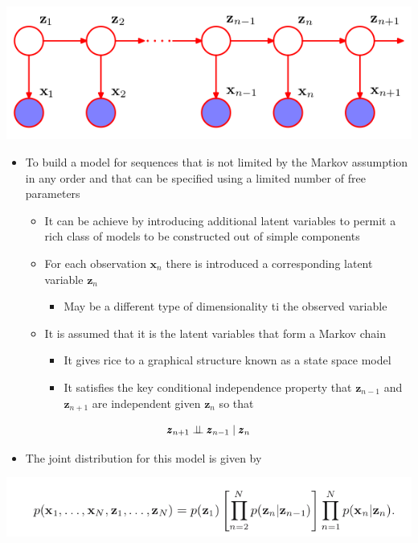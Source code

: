 \documentclass[11pt]{article}
\begin{document}
\begin{center}
\includegraphics[width=.9\linewidth]{Sequential Data/screenshot_2018-10-29_11-21-18.png}
\end{center}
\begin{itemize}
\item To build a model for sequences that is not limited by the Markov assumption in any order and that can be specified using a limited number of free parameters
\begin{itemize}
\item It can be achieve by introducing additional latent variables to permit a rich class of models to be constructed out of simple components
\item For each observation \(\pmb x_n\) there is introduced a corresponding latent variable \(\pmb z_n\)
\begin{itemize}
\item May be a different type of dimensionality ti the observed variable
\end{itemize}
\item It is assumed that it is the latent variables that form a Markov chain
\begin{itemize}
\item It gives rice to a graphical structure known as a state space model
\item It satisfies the key conditional independence property that \(\pmb z_{n-1}\) and \(\pmb z_{n+1}\) are independent given \(\pmb z_{n}\) so that
\end{itemize}
\end{itemize}
\end{itemize}
\begin{equation}
  \pmb z_{n+1} \perp\mkern-9.5mu\perp \pmb z_{n-1} \mid \pmb z_n
\end{equation}
\begin{itemize}
\item The joint distribution for this model is given by
\end{itemize}
\begin{center}
\includegraphics[width=.9\linewidth]{Sequential Data/screenshot_2018-10-29_11-18-12.png}
\end{center}
\end{document}
